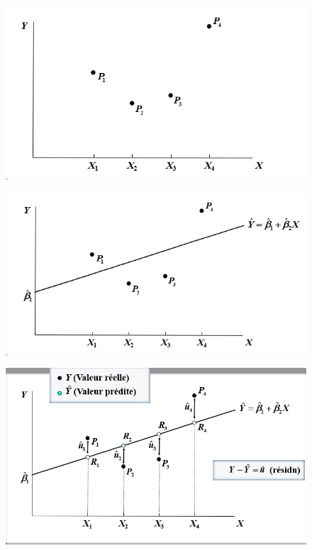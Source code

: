 \documentclass[12pt,aspectratio=1610]{beamer}
\begin{document}
\begin{frame}
	\begin{figure}
		\centering
		\includegraphics[width=0.9\linewidth]{scatterplot}
	\end{figure}
\end{frame}	

\begin{frame}
	\begin{figure}
		\centering
		\includegraphics[width=0.9\linewidth]{ajustement}


	\end{figure}
	
\end{frame}



\begin{frame}
	\begin{figure}
		\centering
		\includegraphics[width=0.9\linewidth]{residuspng}
	\end{figure}
	
\end{frame}
\end{document}
